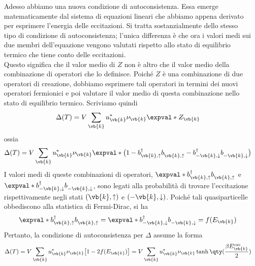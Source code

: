 Adesso abbiamo una nuova condizione di autoconsistenza. Essa emerge matematicamente dal sistema di equazioni lineari che abbiamo appena derivato per esprimere l'energia delle eccitazioni. Si tratta sostanzialmente dello stesso tipo di condizione di autoconsistenza; l'unica differenza è che ora i valori medi sui due membri dell'equazione vengono valutati rispetto allo stato di equilibrio termico che tiene conto delle eccitazioni.\\
Questo significa che il valor medio di $Z$ non è altro che il valor medio della combinazione di operatori che lo definisce. Poiché $Z$ è una combinazione di due operatori di creazione, dobbiamo esprimere tali operatori in termini dei nuovi operatori fermionici e poi valutare il valor medio di questa combinazione nello stato di equilibrio termico. Scriviamo quindi
\begin{equation*}
   \Delta(T)
   =
   V
   \sum_{\vb{k}}
   u^*_{\vb{k}}
   \nu_{\vb{k}}
   \expval*{Z_{\vb{k}}}
\end{equation*}
ossia
\begin{equation*}
   \Delta(T) = V \sum_{\vb{k}} u^*_{\vb{k}} \nu_{\vb{k}} \expval*{ \bigl(1 - b^{\dag}_{\vb{k},\uparrow} b^{\vphantom{\dag}}_{\vb{k},\uparrow} -  b^{\dag}_{-\vb{k},\downarrow} b^{\vphantom{\dag}}_{-\vb{k},\downarrow} \bigr) }
\end{equation*}
I valori medi di queste combinazioni di operatori, $\expval*{b^{\dag}_{\vb{k},\uparrow} b^{\vphantom{\dag}}_{\vb{k},\uparrow}}$ e $\expval*{b^{\dag}_{-\vb{k},\downarrow} b^{\vphantom{\dag}}_{-\vb{k},\downarrow}}$, sono legati alla probabilità di trovare l'eccitazione rispettivamente negli stati $(\vb{k},\uparrow)$ e $(-\vb{k},\downarrow)$. Poiché tali quasiparticelle obbediscono alla statistica di Fermi-Dirac, si ha 
\begin{equation*}
   \expval*{b^{\dag}_{\vb{k},\uparrow} b^{\vphantom{\dag}}_{\vb{k},\uparrow}}
   =\expval*{b^{\dag}_{-\vb{k},\downarrow} b^{\vphantom{\dag}}_{-\vb{k},\downarrow}}
   =f(E_{\vb{k}})
\end{equation*}
Pertanto, la condizione di autoconsistenza per $\Delta$ assume la forma
\begin{equation*}
   \Delta(T)
   = V \sum_{\vb{k}} u^*_{\vb{k}} \nu_{\vb{k}} \bigl[ 1 - 2f(E_{\vb{k}}) \bigr]
   = V \sum_{\vb{k}} u^*_{\vb{k}} \nu_{\vb{k}} \tanh \qty( \frac{\beta E^{\rm exc}_{\vb{k}}}{2} )
\end{equation*}
